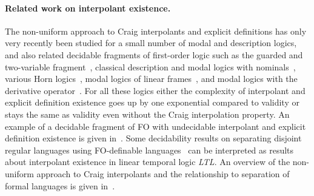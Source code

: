 \documentclass{lmcs} %
\theoremstyle{plain}\newtheorem{satz}[thm]{Satz} %
\newcommand{\nz}[1]{\textcolor{blue}{\bf!}%
	\marginpar[\parbox{15mm}{\raggedleft\scriptsize\textcolor{blue}{#1}}]%
	{\parbox{15mm}{\raggedright\scriptsize\textcolor{blue}{#1}}}}
\newcommand{\LTL}{\textsl{LTL}}
\begin{document}
\paragraph{Related work on interpolant existence.}
%
The non-uniform approach to Craig interpolants and explicit definitions has only very recently been studied for a small number of modal and description logics, and also related decidable fragments of first-order logic such as the guarded and two-variable fragment~\cite{DBLP:conf/lics/JungW21}, classical description and modal logics with nominals~\cite{DBLP:journals/tocl/ArtaleJMOW23},
various Horn logics~\cite{DBLP:series/synthesis/2016Benedikt,DBLP:journals/corr/abs-2202-07186}, modal logics of linear frames~\cite{DBLP:journals/corr/abs-2312-05929}, and modal logics with the derivative operator~\cite{DBLP:journals/corr/abs-2403-11255}. For all these logics either the complexity of interpolant and explicit definition existence goes up by one exponential compared to validity or stays the same as validity even without the Craig interpolation property. An example of a decidable fragment of FO with undecidable interpolant and explicit definition existence is given in~\cite{DL24:undecidability}. 
Some decidability results on separating disjoint regular languages using FO-definable languages~\cite{henkell1,henkell2,DBLP:journals/corr/PlaceZ14} can be interpreted as results about interpolant existence in linear temporal logic \LTL{}. An overview of the non-uniform approach to Craig interpolants and the relationship to separation of formal languages is given in~\cite{chapter:separation}.
\end{document}
